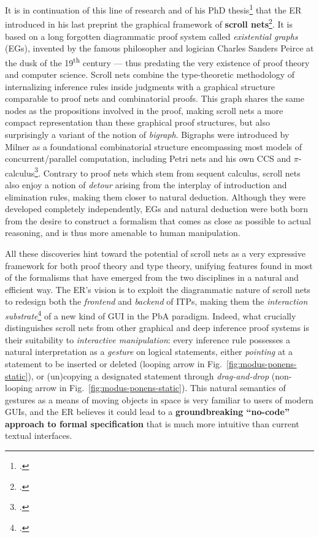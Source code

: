 \documentclass[12pt,draftproposal]{msca-pf}
\begin{document}
It is in continuation of this line of research and of his PhD
thesis\footcite{donatoDeepInferenceGraphical2024} that the ER introduced in his last preprint the
graphical framework of \textbf{scroll nets}\footcite{donatoScrollNets2025}. It is based on a long
forgotten diagrammatic proof system called \emph{existential graphs} (EGs), invented by the famous
philosopher and logician Charles Sanders Peirce at the dusk of the 19\textsuperscript{th} century
--- thus predating the very existence of proof theory and computer science. Scroll nets combine the
type-theoretic methodology of internalizing inference rules inside judgments with a graphical
structure comparable to proof nets and combinatorial proofs. This graph shares the same nodes as the
propositions involved in the proof, making scroll nets a more compact representation than these
graphical proof structures, but also surprisingly a variant of the notion of \emph{bigraph}.
Bigraphs were introduced by Milner as a foundational combinatorial structure encompassing most
models of concurrent/parallel computation, including Petri nets and his own CCS and
$\pi$-calculus\footcite{milnerBigraphicalReactiveSystems2001}. Contrary to proof nets which stem
from sequent calculus, scroll nets also enjoy a notion of \emph{detour} arising from the interplay
of introduction and elimination rules, making them closer to natural deduction. Although they were
developed completely independently, EGs and natural deduction were both born from the desire to
construct a formalism that comes as close as possible to actual reasoning, and is thus more amenable
to human manipulation.

All these discoveries hint toward the potential of scroll nets as a very expressive framework for
both proof theory and type theory, unifying features found in most of the formalisms that have
emerged from the two disciplines in a natural and efficient way. The ER's vision is to exploit the
diagrammatic nature of scroll nets to redesign both the \emph{frontend} and \emph{backend} of ITPs,
making them the \emph{interaction substrate}\footcite{mackayInteractionSubstratesCombining2025} of a
new kind of GUI in the PbA paradigm. Indeed, what crucially distinguishes scroll nets from other
graphical and deep inference proof systems is their suitability to \emph{interactive manipulation}:
every inference rule possesses a natural interpretation as a \emph{gesture} on logical statements,
either \emph{pointing} at a statement to be inserted or deleted (looping arrow in
Fig.~\ref{fig:modus-ponens-static}), or (un)copying a designated statement through
\emph{drag-and-drop} (non-looping arrow in Fig.~\ref{fig:modus-ponens-static}). This natural
semantics of gestures as a means of moving objects in space is very familiar to users of modern
GUIs, and the ER believes it could lead to a \textbf{groundbreaking ``no-code'' approach to formal
specification} that is much more intuitive than current textual interfaces.
 
\end{document}
